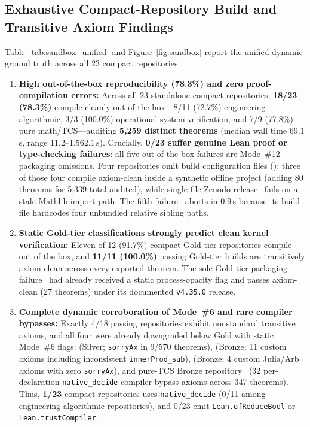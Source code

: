 \documentclass[11pt,letterpaper]{article}
\begin{document}
\subsection{Exhaustive Compact-Repository Build and Transitive Axiom Findings}
Table~\ref{tab:sandbox_unified} and Figure~\ref{fig:sandbox} report the unified dynamic ground truth across all 23 compact repositories:
\begin{enumerate}
  \item \textbf{High out-of-the-box reproducibility (78.3\%) and zero proof-compilation errors:} Across all 23 standalone compact repositories, \textbf{18/23 (78.3\%)} compile cleanly out of the box---8/11 (72.7\%) engineering algorithmic, 3/3 (100.0\%) operational system verification, and 7/9 (77.8\%) pure math/TCS---auditing \textbf{5,259 distinct theorems} (median wall time 69.1\,s, range 11.2--1,562.1\,s). Crucially, \textbf{0/23 suffer genuine Lean proof or type-checking failures}: all five out-of-the-box failures are Mode~\#12 packaging omissions. Four repositories omit build configuration files (\cite{arxiv2611_18220,arxiv2611_23762,arxiv2605_12537,arxiv2611_11641}); three of those four compile axiom-clean inside a synthetic offline project (adding 80 theorems for 5,339 total audited), while single-file Zenodo release~\cite{arxiv2611_11641} fails on a stale Mathlib import path. The fifth failure~\cite{arxiv2605_02856} aborts in 0.9\,s because its build file hardcodes four unbundled relative sibling paths.
  \item \textbf{Static Gold-tier classifications strongly predict clean kernel verification:} Eleven of 12 (91.7\%) compact Gold-tier repositories compile out of the box, and \textbf{11/11 (100.0\%)} passing Gold-tier builds are transitively axiom-clean across every exported theorem. The sole Gold-tier packaging failure~\cite{arxiv2611_18220} had already received a static process-opacity flag and passes axiom-clean (27 theorems) under its documented \texttt{v4.35.0} release.
  \item \textbf{Complete dynamic corroboration of Mode~\#6 and rare compiler bypasses:} Exactly 4/18 passing repositories exhibit nonstandard transitive axioms, and all four were already downgraded below Gold with static Mode~\#6 flags: \cite{arxiv2611_16690} (Silver; \texttt{sorryAx} in 9/570 theorems), \cite{arxiv2605_16407} (Bronze; 11 custom axioms including inconsistent \texttt{innerProd\_sub}), \cite{arxiv2611_07395} (Bronze; 4 custom Julia/Arb axioms with zero \texttt{sorryAx}), and pure-TCS Bronze repository~\cite{arxiv2611_15711} (32 per-declaration \texttt{native\_decide} compiler-bypass axioms across 347 theorems). Thus, \textbf{1/23} compact repositories uses \texttt{native\_decide} (0/11 among engineering algorithmic repositories), and 0/23 emit \texttt{Lean.ofReduceBool} or \texttt{Lean.trustCompiler}.

\end{enumerate}
\end{document}
